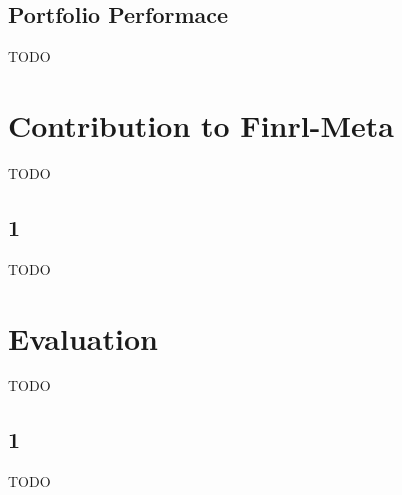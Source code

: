 \section{Portfolio Performace}
TODO




\chapter{Contribution to Finrl-Meta}
TODO


\section{1}
TODO



\chapter{Evaluation}
TODO


\section{1}
TODO
